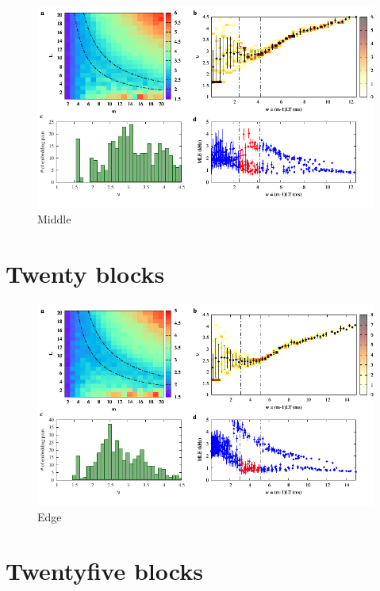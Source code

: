 \begin{figure}[H]
    \centering
    \includegraphics[width=\linewidth]{../15_blocks/middle/2e5_points/plots/chaos_low.pdf}
    \caption{Middle}
    \label{fig:15 blocks middle chaos}
\end{figure}

\section{Twenty blocks}

\begin{figure}[H]
    \centering
    \includegraphics[width=\linewidth]{../20_blocks/2e5_points/plots/chaos_low.pdf}
    \caption{Edge}
    \label{fig:20 blocks chaos}
\end{figure}

\section{Twentyfive blocks}

